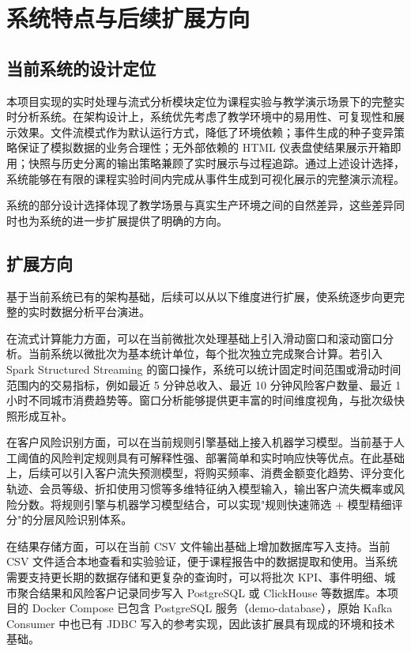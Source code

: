 \documentclass[12pt,hyperref,a4paper,UTF8]{ctexart}
\begin{document}
\section{系统特点与后续扩展方向}

\subsection{当前系统的设计定位}

本项目实现的实时处理与流式分析模块定位为课程实验与教学演示场景下的完整实时分析系统。在架构设计上，系统优先考虑了教学环境中的易用性、可复现性和展示效果。文件流模式作为默认运行方式，降低了环境依赖；事件生成的种子变异策略保证了模拟数据的业务合理性；无外部依赖的 HTML 仪表盘使结果展示开箱即用；快照与历史分离的输出策略兼顾了实时展示与过程追踪。通过上述设计选择，系统能够在有限的课程实验时间内完成从事件生成到可视化展示的完整演示流程。

系统的部分设计选择体现了教学场景与真实生产环境之间的自然差异，这些差异同时也为系统的进一步扩展提供了明确的方向。

\subsection{扩展方向}

基于当前系统已有的架构基础，后续可以从以下维度进行扩展，使系统逐步向更完整的实时数据分析平台演进。

在流式计算能力方面，可以在当前微批次处理基础上引入滑动窗口和滚动窗口分析。当前系统以微批次为基本统计单位，每个批次独立完成聚合计算。若引入 Spark Structured Streaming 的窗口操作，系统可以统计固定时间范围或滑动时间范围内的交易指标，例如最近 5 分钟总收入、最近 10 分钟风险客户数量、最近 1 小时不同城市消费趋势等。窗口分析能够提供更丰富的时间维度视角，与批次级快照形成互补。

在客户风险识别方面，可以在当前规则引擎基础上接入机器学习模型。当前基于人工阈值的风险判定规则具有可解释性强、部署简单和实时响应快等优点。在此基础上，后续可以引入客户流失预测模型，将购买频率、消费金额变化趋势、评分变化轨迹、会员等级、折扣使用习惯等多维特征纳入模型输入，输出客户流失概率或风险分数。将规则引擎与机器学习模型结合，可以实现"规则快速筛选 + 模型精细评分"的分层风险识别体系。

在结果存储方面，可以在当前 CSV 文件输出基础上增加数据库写入支持。当前 CSV 文件适合本地查看和实验验证，便于课程报告中的数据提取和使用。当系统需要支持更长期的数据存储和更复杂的查询时，可以将批次 KPI、事件明细、城市聚合结果和风险客户记录同步写入 PostgreSQL 或 ClickHouse 等数据库。本项目的 Docker Compose 已包含 PostgreSQL 服务（demo-database），原始 Kafka Consumer 中也已有 JDBC 写入的参考实现，因此该扩展具有现成的环境和技术基础。
\end{document}
